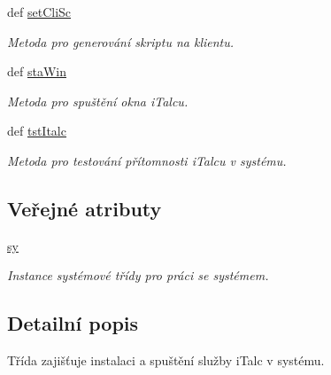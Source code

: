 \begin{DoxyCompactItemize}
def \hyperlink{classiTaHand_1_1iTaHand_af0efe4524aaf862e6edc470c970bdfec}{set\-Cli\-Sc}
\begin{DoxyCompactList}\small\item\em Metoda pro generování skriptu na klientu. \end{DoxyCompactList}\item 
def \hyperlink{classiTaHand_1_1iTaHand_a457b5b5eea69bc89feedccd9d9c284ea}{sta\-Win}
\begin{DoxyCompactList}\small\item\em Metoda pro spuštění okna i\-Talcu. \end{DoxyCompactList}\item 
def \hyperlink{classiTaHand_1_1iTaHand_a8d32bbd5a4612858700fd3ec4f7a42bc}{tst\-Italc}
\begin{DoxyCompactList}\small\item\em Metoda pro testování přítomnosti i\-Talcu v systému. \end{DoxyCompactList}\end{DoxyCompactItemize}
\subsection*{Veřejné atributy}
\begin{DoxyCompactItemize}
\item 
\hypertarget{classiTaHand_1_1iTaHand_a926ddaf1090328b21386ed76edc484c5}{\hyperlink{classiTaHand_1_1iTaHand_a926ddaf1090328b21386ed76edc484c5}{sy}}\label{dc/de8/classiTaHand_1_1iTaHand_a926ddaf1090328b21386ed76edc484c5}

\begin{DoxyCompactList}\small\item\em Instance systémové třídy pro práci se systémem. \end{DoxyCompactList}\end{DoxyCompactItemize}


\subsection{Detailní popis}
Třída zajišťuje instalaci a spuštění služby i\-Talc v systému. 

